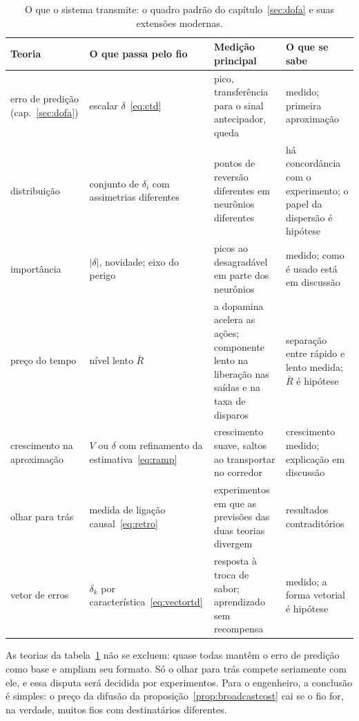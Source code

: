 \begin{table}[t]
\centering
\footnotesize
\setlength{\tabcolsep}{4pt}
\renewcommand{\arraystretch}{1.15}
\begin{tabular}{>{\raggedright}p{2.5cm}>{\raggedright}p{3.2cm}>{\raggedright}p{3.6cm}>{\raggedright\arraybackslash}p{4.2cm}}
\toprule
Teoria & O que passa pelo fio & Medição principal & O que se sabe \\
\midrule
erro de predição (cap.~\ref{sec:dofa}) & escalar $\delta$~\eqref{eq:ctd} & pico, transferência para o sinal antecipador, queda & medido; primeira aproximação \\
distribuição & conjunto de $\delta_i$ com assimetrias diferentes & pontos de reversão diferentes em neurônios diferentes & há concordância com o experimento; o papel da dispersão é hipótese \\
importância & $|\delta|$, novidade; eixo do perigo & picos ao desagradável em parte dos neurônios & medido; como é usado está em discussão \\
preço do tempo & nível lento $\bar R$ & a dopamina acelera as ações; componente lento na liberação nas saídas e na taxa de disparos & separação entre rápido e lento medida; $\bar R$ é hipótese \\
crescimento na aproximação & $V$ ou $\delta$ com refinamento da estimativa~\eqref{eq:ramp} & crescimento suave, saltos ao transportar no corredor & crescimento medido; explicação em discussão \\
olhar para trás & medida de ligação causal~\eqref{eq:retro} & experimentos em que as previsões das duas teorias divergem & resultados contraditórios \\
vetor de erros & $\delta_k$ por característica~\eqref{eq:vectortd} & resposta à troca de sabor; aprendizado sem recompensa & medido; a forma vetorial é hipótese \\
\bottomrule
\end{tabular}
\caption{O que o sistema  transmite: o quadro padrão do capítulo~\ref{sec:dofa} e suas extensões modernas.}
\label{tab:dofaalt}
\end{table}

As teorias da tabela~\ref{tab:dofaalt} não se excluem: quase todas mantêm o erro de predição como base e ampliam seu formato. Só o olhar para trás compete seriamente com ele, e essa disputa será decidida por experimentos. Para o engenheiro, a conclusão é simples: o preço da difusão da proposição~\ref{prop:broadcastcost} cai se o fio for, na verdade, muitos fios com destinatários diferentes.

